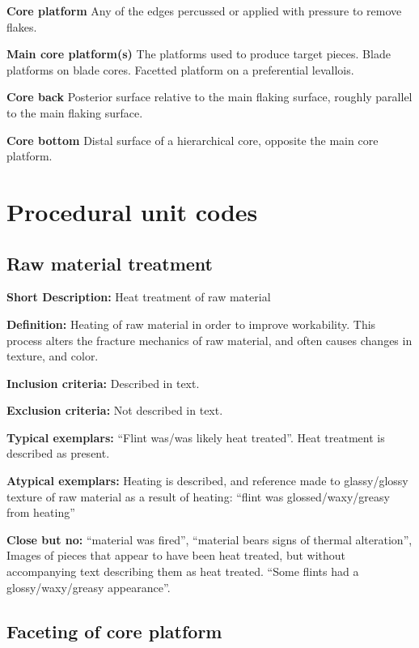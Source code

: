 \documentclass[
]{article}
\begin{document}
\textbf{Core platform} Any of the edges percussed or applied with
pressure to remove flakes.

\textbf{Main core platform(s)} The platforms used to produce target
pieces. Blade platforms on blade cores. Facetted platform on a
preferential levallois.

\textbf{Core back} Posterior surface relative to the main flaking
surface, roughly parallel to the main flaking surface.

\textbf{Core bottom} Distal surface of a hierarchical core, opposite the
main core platform.

\section{Procedural unit codes}\label{procedural-unit-codes}

\subsection{Raw material treatment}\label{raw-material-treatment}

\textbf{Short Description:} Heat treatment of raw material

\textbf{Definition:} Heating of raw material in order to improve
workability. This process alters the fracture mechanics of raw material,
and often causes changes in texture, and color.

\textbf{Inclusion criteria:} Described in text.

\textbf{Exclusion criteria:} Not described in text.

\textbf{Typical exemplars:} ``Flint was/was likely heat treated''. Heat
treatment is described as present.

\textbf{Atypical exemplars:} Heating is described, and reference made to
glassy/glossy texture of raw material as a result of heating: ``flint
was glossed/waxy/greasy from heating''

\textbf{Close but no:} ``material was fired'', ``material bears signs of
thermal alteration'', Images of pieces that appear to have been heat
treated, but without accompanying text describing them as heat treated.
``Some flints had a glossy/waxy/greasy appearance''.

\subsection{Faceting of core platform}\label{faceting-of-core-platform}
\end{document}
